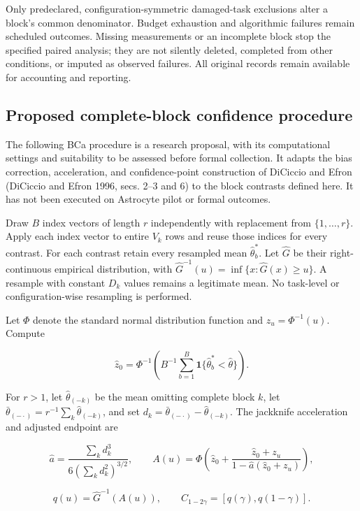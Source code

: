 \documentclass[
  english,
  11pt,
]{article}
\begin{document}
Only predeclared, configuration-symmetric damaged-task exclusions alter
a block's common denominator. Budget exhaustion and algorithmic failures
remain scheduled outcomes. Missing measurements or an incomplete block
stop the specified paired analysis; they are not silently deleted,
completed from other conditions, or imputed as observed failures. All
original records remain available for accounting and reporting.

\subsection{Proposed complete-block confidence
procedure}\label{proposed-complete-block-confidence-procedure}

The following BCa procedure is a research proposal, with its
computational settings and suitability to be assessed before formal
collection. It adapts the bias correction, acceleration, and
confidence-point construction of DiCiccio and Efron (DiCiccio and Efron
1996, secs. 2--3 and 6) to the block contrasts defined here. It has not
been executed on Astrocyte pilot or formal outcomes.

Draw \(B\) index vectors of length \(r\) independently with replacement
from \(\{1,\ldots,r\}\). Apply each index vector to entire \(V_k\) rows
and reuse those indices for every contrast. For each contrast retain
every resampled mean \(\hat\theta_b^*\). Let \(\hat G\) be their
right-continuous empirical distribution, with
\(\hat G^{-1}(u)=\inf\{x:\hat G(x)\geq u\}\). A resample with constant
\(D_k\) values remains a legitimate mean. No task-level or
configuration-wise resampling is performed.

Let \(\Phi\) denote the standard normal distribution function and
\(z_u=\Phi^{-1}(u)\). Compute

\[
\hat z_0=\Phi^{-1}\!\left(B^{-1}\sum_{b=1}^{B}
\mathbf 1\{\hat\theta_b^*<\hat\theta\}\right).
\]

For \(r>1\), let \(\hat\theta_{(-k)}\) be the mean omitting complete
block \(k\), let
\(\bar\theta_{(-\cdot)}=r^{-1}\sum_k\hat\theta_{(-k)}\), and set
\(d_k=\bar\theta_{(-\cdot)}-\hat\theta_{(-k)}\). The jackknife
acceleration and adjusted endpoint are

\[
\hat a=\frac{\sum_k d_k^3}{6(\sum_k d_k^2)^{3/2}},
\qquad
A(u)=\Phi\!\left(\hat z_0+
\frac{\hat z_0+z_u}{1-\hat a(\hat z_0+z_u)}\right),
\]

\[
q(u)=\hat G^{-1}(A(u)),\qquad
C_{1-2\gamma}=[q(\gamma),q(1-\gamma)].
\]
\end{document}
